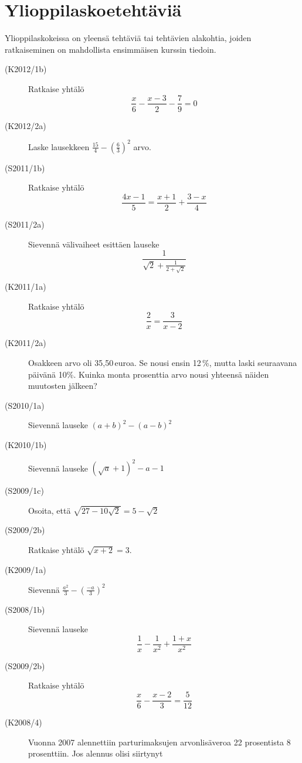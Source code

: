 \chapter{Ylioppilaskoetehtäviä}

Ylioppilaskokeissa on yleensä tehtäviä tai tehtävien alakohtia, joiden ratkaiseminen on mahdollista ensimmäisen kurssin tiedoin.

\begin{description}

    \item[(K2012/1b)]  Ratkaise yhtälö
                        \[\frac{x}{6} - \frac{x-3}{2} - \frac{7}{9} = 0 \]
    \item[(K2012/2a)]  Laske lausekkeen $ \frac{15}{4} - \left( \frac{6}{3} \right)^2 $ arvo.
    \item[(S2011/1b)]  Ratkaise yhtälö
                        \[ \frac{4x - 1}{5} = \frac{x + 1}{2} + \frac{3 - x}{4} \]
    \item[(S2011/2a)]  Sievennä välivaiheet esittäen lauseke
                        \[ \frac{1}{\sqrt{2} + \frac{1}{2 + \sqrt{2}}} \]
    \item[(K2011/1a)]  Ratkaise yhtälö
                        \[ \frac{2}{x} = \frac{3}{x - 2} \]
    \item[(K2011/2a)]  Osakkeen arvo oli 35,50\,euroa. Se nousi ensin 12\,\%,
                        mutta laski seuraavana päivänä 10\%. Kuinka monta prosenttia
                        arvo nousi yhteensä näiden muutosten jälkeen?
    \item[(S2010/1a)]  Sievennä lauseke $ (a + b)^2 - (a - b)^2 $
    \item[(K2010/1b)]  Sievennä lauseke $ (\sqrt{a} + 1)^2 - a - 1 $
    \item[(S2009/1c)]  Osoita, että $ \sqrt{27 - 10 \sqrt{ 2} } = 5 - \sqrt{2} $
    \item[(S2009/2b)]  Ratkaise yhtälö $ \sqrt{x + 2 } = 3  $.
    \item[(K2009/1a)]  Sievennä $ \frac{a^2}{3} - \left( \frac{-a}{3} \right)^2 $
    \item[(S2008/1b)]  Sievennä lauseke
                        \[ \frac{1}{x} - \frac{1}{x^2} + \frac{1 + x}{x^2} \]
    \item[(S2009/2b)]  Ratkaise yhtälö
                        \[ \frac{x}{6} - \frac{x - 2}{3} = \frac{5}{12} \]
    \item[(K2008/4)]   Vuonna 2007 alennettiin parturimaksujen arvonlisäveroa 22
                        prosentista 8 prosenttiin. Jos alennus olisi siirtynyt

\end{description}
